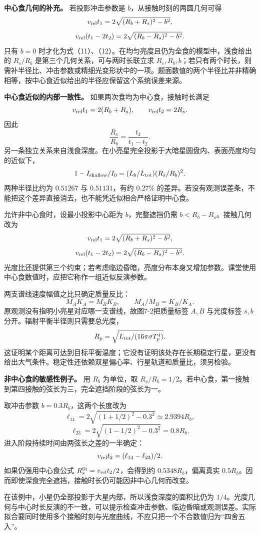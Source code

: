\documentclass[12pt,a4paper,UTF8]{ctexart}
\begin{document}
\textbf{中心食几何的补充。} 若投影冲击参数是
\(b\)，从接触时刻的两圆几何可得 \[
v_{\rm rel}t_1=2\sqrt{(R_b+R_s)^2-b^2},
\] \[
v_{\rm rel}(t_1-2t_2)=2\sqrt{(R_b-R_s)^2-b^2}.
\] 只有 \(b=0\)
时才化为式（11）、（12）。在均匀亮度且仍为全食的模型中，浅食给出的
\(R_s/R_b\) 是第三个几何关系，可与两时长联立求
\(R_s,R_b,b\)；若只有两个时长，则需补半径比、冲击参数或精细光变形状中的一项。题面数值的两个半径比并非精确相等，按中心食近似给出的半径应保留这个系统误差来源。

\textbf{中心食近似的内部一致性。} 如果两次食均为中心食，接触时长满足 \[
v_{\rm rel}t_1=2(R_b+R_s),\qquad
v_{\rm rel}t_2=2R_s.
\] 因此 \[
\frac{R_s}{R_b}=\frac{t_2}{t_1-t_2}.
\]
另一条独立关系来自浅食深度。在小亮星完全投影于大暗星圆盘内、表面亮度均匀的近似下，
\[
1-I_{\rm shallow}/I_0=(L_b/L_{\rm tot})(R_s/R_b)^2.
\] 两种半径比约为 \(0.51267\) 与 \(0.51131\)，有约 \(0.27\%\)
的差异。若没有观测误差条，不能把这个差异直接消去，也不能凭近似相合严格证明中心食。

允许非中心食时，设最小投影中心距为 \(b\)，完整遮挡仍需
\(b<R_b-R_s\)。接触几何改为 \[
v_{\rm rel}t_1=2\sqrt{(R_b+R_s)^2-b^2},
\] \[
v_{\rm rel}(t_1-2t_2)=2\sqrt{(R_b-R_s)^2-b^2}.
\]
光度比还提供第三个约束；若考虑临边昏暗，亮度分布本身又增加参数。课堂使用中心食数值时，应把它称作一组近似反演参数。

两支谱线速度幅值之比只确定质量反比： \[
M_AK_A=M_BK_B,\qquad M_A/M_B=K_B/K_A.
\] 原观测没有指明小亮星对应哪一支谱线，故图7-2把质量标签 \(A,B\)
与光度标签 \(s,b\) 分开。辐射平衡半径则只需要总光度， \[
R_p=\sqrt{L_{\rm tot}/(16\pi\sigma T_p^4)}.
\]
这证明某个距离可达到目标平衡温度；它没有证明该处存在长期稳定行星，更没有给出大气条件。稳定性还依赖双星偏心率、行星轨道和质量比，须另检验。

\textbf{非中心食的敏感性例子。} 用 \(R_b\) 为单位，取
\(R_s/R_b=1/2\)。若中心食，第一接触到第四接触的弦长为三，完全遮挡阶段的弦长为一。

取冲击参数 \(b=0.3R_b\)，这两个长度改为 \[
\ell_{14}=2\sqrt{(1+1/2)^2-0.3^2}\simeq2.9394R_b,
\] \[
\ell_{23}=2\sqrt{(1-1/2)^2-0.3^2}=0.8R_b.
\] 进入阶段持续时间由两弦长之差的一半确定： \[
v_{\rm rel}t_2=(\ell_{14}-\ell_{23})/2.
\] 如果仍强用中心食公式 \(R_s^{\rm fit}=v_{\rm rel}t_2/2\)，会得到约
\(0.5348R_b\)，偏离真实
\(0.5R_b\)。因而即使深食完全遮挡，接触时长仍可能因非中心几何而改变。

在该例中，小星仍全部投影于大星内部，所以浅食深度的面积比仍为
\(1/4\)。光度几何与中心时长反演的不一致，可以提示检查冲击参数、临边昏暗或观测误差。实际拟合要同时使用多个接触时刻与光度曲线，不应只把一个不合数值归为``四舍五入''。
\end{document}

